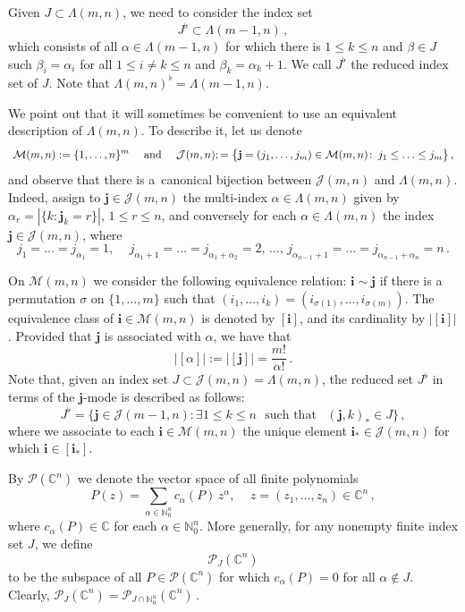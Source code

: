\documentclass[12pt]{amsart}
\numberwithin{subsection}{section}
\theoremstyle{definition}
\theoremstyle{remark}
\newcommand{\bi}{\mathbf i}
\newcommand{\bj}{\mathbf j}
\begin{document}
Given  $J \subset  \Lambda(m,n)$, we  need to consider  the index set
\[
J^\flat \subset \Lambda(m-1,n)\,,
\]
which consists of all $\alpha \in \Lambda(m-1,n)$ for which there is $1 \leq k \leq n$ and $\beta \in J$ such $\beta_i = \alpha_i$
for all $1 \leq i\neq  k\leq n$ and $\beta_k = \alpha_k +1$. We call $J^\flat$ the reduced index
set of $J$. Note that $\Lambda(m,n)^\flat=\Lambda(m-1,n)$.


We point out that it will sometimes be convenient to use an equivalent description of \(\Lambda(m,n)\). To describe it, let us denote
\[
\text{
$
\mathcal{M}(m,n)  := \{1, \ldots, n\}^{m}$ \quad  and \quad $ \mathcal{J}(m,n);  = \big\{\bj
= (j_1, \ldots, j_m) \in \mathcal{M}(m, n)\colon \, j_1 \leq \ldots \leq j_m\big\}\,,
$
}
\]
and observe that there is a~canonical bijection between $\mathcal{J}(m,n)$ and $\Lambda(m,n)$. Indeed, assign to
$\bj \in \mathcal{J}(m,n) $ the multi-index $\alpha \in \Lambda(m,n)$ given by $\alpha_r = |\{k \colon \bj_k = r\}|,\, 1 \leq r \leq n$,
and conversely for each $\alpha \in \Lambda(m,n)$ the index $\bj \in \mathcal{J}(m,n)$, where
\[
j_1 =\ldots =j_{\alpha_1} =1, \quad\, j_{\alpha_1 +1} =\ldots =j_{\alpha_1+\alpha_2} =2,\, \dots , \,j_{\alpha_{n-1} +1}
=\ldots =j_{\alpha_{n-1}+\alpha_n} = n\,.
\]

\noindent
On $\mathcal{M}(m,n)$ we consider the following equivalence relation: $\bi  \sim \bj$ if there is a permutation $\sigma$ on $\{1, \ldots,m\}$
such that $(i_1, \ldots, i_k) = (i_{\sigma(1)}, \ldots, i_{\sigma(m)})$. The equivalence class of $\bi \in \mathcal{M}(m,n)$ is
denoted by $[\bi]$, and its cardinality  by $|[\bi]|$. Provided that $\bj$ is associated with $\alpha$, we have that
\begin{equation*}
|[\alpha]| :=  |[\bj]| =\frac{m!}{\alpha!}\,.
\end{equation*}
Note that, given an index set \( J \subset \mathcal{J}(m,n) = \Lambda(m,n) \), the reduced set \( J^\flat \) in terms of the \(\mathbf{j}\)-mode is described as follows:
\begin{equation}\label{index sets}
J^\flat = \big\{ \bj \in \mathcal{J}(m-1,n)
\colon \exists 1 \leq k \leq n \,\, \text{  such that }\,\,\, (\bj,k)_\ast \in J \big\}\,,
\end{equation}
where we associate to each $\bi \in \mathcal{M}(m,n)$  the unique element $\bi_\ast\in \mathcal{J}(m,n)$ for which $\bi \in [\bi_\ast]$.

By $\mathcal{P}(\mathbb{C}^n)$ we denote the vector space of all finite  polynomials
\[
P(z)=\sum_{\alpha\in \mathbb{N}_0^n}c_\alpha(P)\,z^\alpha, \quad\, z=(z_1, \ldots, z_n)\in \mathbb{C}^n\,,
\]
where $c_\alpha(P)\in \mathbb{C}$ for each $\alpha \in \mathbb{N}_0^n$. More generally, for any  nonempty  finite index set $J$, we define
$$\mathcal{P}_J(\mathbb{C}^n)$$
to be the subspace of all $P \in \mathcal{P}(\mathbb{C}^n)$ for which $c_{\alpha}(P) = 0$ for all $\alpha \notin J$. Clearly,
$
\mathcal{P}_J(\mathbb{C}^n) = \mathcal{P}_{J\cap \mathbb{N}_0^n}(\mathbb{C}^n)\,.
$
\end{document}
